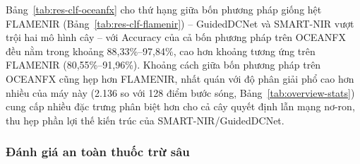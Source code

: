\documentclass[10pt,twocolumn,twoside]{article}
\begin{document}
Bảng~\ref{tab:res-clf-oceanfx} cho thứ hạng giữa bốn phương pháp giống hệt
FLAMENIR (Bảng~\ref{tab:res-clf-flamenir}) -- GuidedDCNet và SMART-NIR vượt
trội hai mô hình cây -- với Accuracy của cả bốn phương pháp trên OCEANFX
đều nằm trong khoảng 88,33\%--97,84\%, cao hơn khoảng tương ứng trên
FLAMENIR (80,55\%--91,96\%). Khoảng cách giữa bốn phương pháp trên OCEANFX
cũng hẹp hơn FLAMENIR, nhất quán với độ phân giải phổ cao hơn nhiều của máy
này (2.136 so với 128 điểm bước sóng, Bảng~\ref{tab:overview-stats}) cung
cấp nhiều đặc trưng phân biệt hơn cho cả cây quyết định lẫn mạng nơ-ron,
thu hẹp phần lợi thế kiến trúc của SMART-NIR/GuidedDCNet.

\subsubsection{Đánh giá an toàn thuốc trừ sâu}
\end{document}
